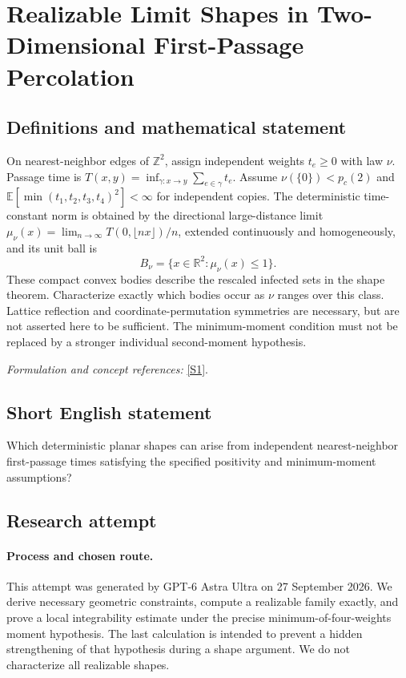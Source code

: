 \documentclass[11pt]{article}
\begin{document}
\section*{\texorpdfstring{Realizable Limit Shapes in Two-Dimensional First-Passage Percolation}{Realizable Limit Shapes in Two-Dimensional First-Passage Percolation}}\label{statement}
\subsection{Definitions and mathematical statement}
On nearest-neighbor edges of ${\mathbb{Z}}^2$, assign independent weights $t_e\ge0$ with law $\nu$. Passage time is $T(x,y)=\inf_{\gamma:x\to y}\sum_{e\in\gamma}t_e$. Assume $\nu(\{0\})<p_c(2)$ and ${\mathbb{E}}[\min(t_1,t_2,t_3,t_4)^2]<\infty$ for independent copies. The deterministic time-constant norm is obtained by the directional large-distance limit $\mu_\nu(x)=\lim_{n\to\infty}T(0,\lfloor nx\rfloor)/n$, extended continuously and homogeneously, and its unit ball is
\[
 B_\nu=\{x\in{\mathbb{R}}^2:\mu_\nu(x)\le1\}.
\]
These compact convex bodies describe the rescaled infected sets in the shape theorem. Characterize exactly which bodies occur as $\nu$ ranges over this class. Lattice reflection and coordinate-permutation symmetries are necessary, but are not asserted here to be sufficient. The minimum-moment condition must not be replaced by a stronger individual second-moment hypothesis.
\par\smallskip\textit{Formulation and concept references:} \href{https://sites.math.duke.edu/~rtd/FPP/50yrsFPP.pdf}{[S1]}.

\subsection{Short English statement}
Which deterministic planar shapes can arise from independent nearest-neighbor first-passage times satisfying the specified positivity and minimum-moment assumptions?
\subsection{Research attempt}
\paragraph{Process and chosen route.}
This attempt was generated by GPT-6 Astra Ultra on 27 September 2026. We derive necessary geometric constraints, compute a realizable family exactly, and prove a local integrability estimate under the precise minimum-of-four-weights moment hypothesis. The last calculation is intended to prevent a hidden strengthening of that hypothesis during a shape argument. We do not characterize all realizable shapes.
\end{document}
